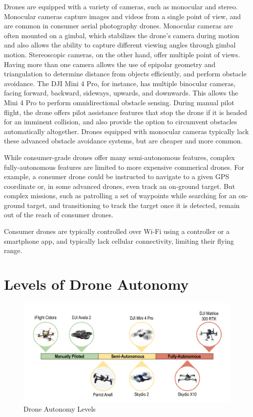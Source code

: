 Drones are equipped with a variety of cameras, such as monocular and stereo.
Monocular cameras capture images and videos from a single point of view, and
are common in consumer aerial photography drones. Monocular cameras are often
mounted on a gimbal, which stabilizes the drone's camera during motion and also
allows the ability to capture different viewing angles through gimbal motion.
Stereoscopic cameras, on the other hand, offer multiple point of views. Having
more than one camera allows the use of epipolar geometry and triangulation to
determine distance from objects efficiently, and perform obstacle avoidance.
The DJI Mini 4 Pro, for instance, has multiple binocular cameras, facing
forward, backward, sideways, upwards, and downwards. This allows the Mini 4 Pro
to perform omnidirectional obstacle sensing. During manual pilot flight, the
drone offers pilot assistance features that stop the drone if it is headed for
an imminent collision, and also provide the option to circumvent obstacles
automatically altogether. Drones equipped with monocular cameras typically lack
these advanced obstacle avoidance systems, but are cheaper and more common.

While consumer-grade drones offer many semi-autonomous features, complex
fully-autonomous features are limited to more expensive commerical drones.  For
example, a consumer drone could be instructed to navigate to a given GPS
coordinate or, in some advanced drones, even track an on-ground target. But
complex missions, such as patrolling a set of waypoints while searching for an
on-ground target, and transitioning to track the target once it is detected,
remain out of the reach of consumer drones.

Consumer drones are typically controlled over Wi-Fi using a controller or a
smartphone app, and typically lack cellular connectivity, limiting their
flying range.

\section{Levels of Drone Autonomy}
\label{sec:autonomy-levels}

\begin{figure}[htbp]
\centerline{\includegraphics[width = .8\textwidth]{figs/autonomy-spectrum.pdf}}
\caption{Drone Autonomy Levels}
\label{fig:drone-autonomy-spectrum}
\end{figure}

